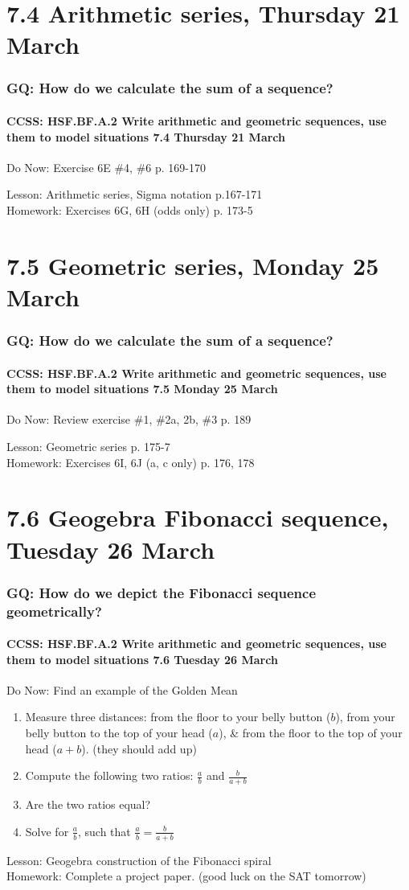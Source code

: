 \documentclass{beamer}
\begin{document}
  \section{7.4 Arithmetic series, Thursday 21 March}
    \frame
    {
      \frametitle{GQ: How do we calculate the sum of a sequence?}
      \framesubtitle{CCSS: HSF.BF.A.2 Write arithmetic and geometric sequences, use them to model situations \hfill \alert{7.4 Thursday 21 March}}

      \begin{block}{Do Now: Exercise 6E \#4, \#6 p. 169-170}
      \end{block}
      Lesson: Arithmetic series, Sigma notation p.167-171\\[1cm]
      Homework: Exercises 6G, 6H (odds only) p.  173-5
    }

  \section{7.5 Geometric series, Monday 25 March}
    \frame
    {
      \frametitle{GQ: How do we calculate the sum of a sequence?}
      \framesubtitle{CCSS: HSF.BF.A.2 Write arithmetic and geometric sequences, use them to model situations \hfill \alert{7.5 Monday 25 March}}

      \begin{block}{Do Now: Review exercise \#1, \#2a, 2b, \#3 p. 189}
      \end{block}
      Lesson: Geometric series p. 175-7\\[1cm]
      Homework: Exercises 6I, 6J (a, c only) p.  176, 178
    }

\section{7.6 Geogebra Fibonacci sequence, Tuesday 26 March}
  \frame
  {
    \frametitle{GQ: How do we depict the Fibonacci sequence geometrically?}
    \framesubtitle{CCSS: HSF.BF.A.2 Write arithmetic and geometric sequences, use them to model situations \hfill \alert{7.6 Tuesday 26 March}}

    \begin{block}{Do Now: Find an example of the Golden Mean}
      \begin{enumerate}
        \item Measure three distances:  from the floor to your belly button ($b$), from your belly button to the top of your head ($a$), \& from the floor to the top of your head ($a+b$). (they should add up)
        \item Compute the following two ratios: $\frac{a}{b}$ and $\frac{b}{a+b}$
        \item Are the two ratios equal?
        \item Solve for $\frac{a}{b}$, such that $\frac{a}{b} = \frac{b}{a+b}$
    \end{enumerate}
    \end{block}
    Lesson: Geogebra construction of the Fibonacci spiral \\
    Homework: Complete a project paper. (good luck on the SAT tomorrow)
  }
\end{document}
